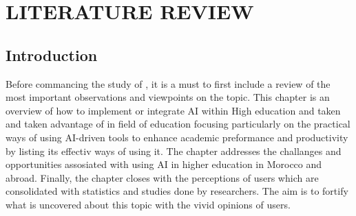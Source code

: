 \chapter{LITERATURE REVIEW}\label{ch:literature-review}
\section{Introduction}
\justifying
Before commancing the study of , it is a must to first include a review of the most
important observations and viewpoints on the topic. This chapter is an overview of how to 
implement or integrate AI within High education and taken and taken advantage of in field of education
focusing particularly on the practical ways of using AI-driven tools 
to enhance academic preformance and productivity by listing its effectiv ways of using it.
The chapter addresses the challanges and opportunities assosiated with using AI in higher education in
Morocco and abroad. Finally, the chapter closes with the perceptions of users which are consolidated with
statistics and studies done by researchers. The aim is to fortify what is uncovered about this
topic with the vivid opinions of users.
